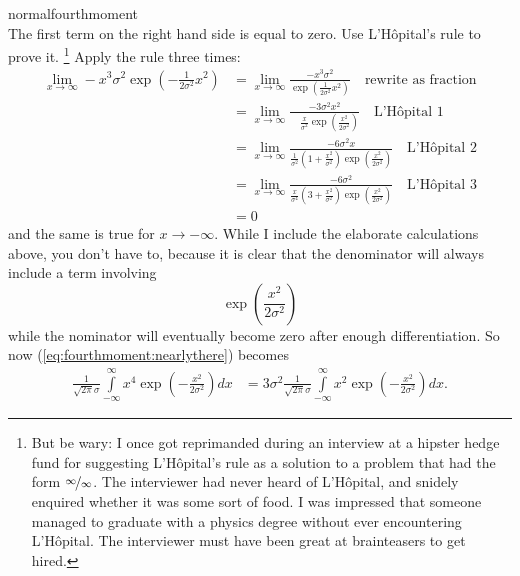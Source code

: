 \begin{answer}{normalfourthmoment}
\begin{equation}
\end{equation}
The first term on the right hand side is equal to zero.
Use L'Hôpital's rule to prove it.%
\footnote{But be wary:
I once got reprimanded during an interview at a hipster hedge fund for suggesting
L'Hôpital's rule as a solution to a problem that had the form $\nicefrac{\infty}{\infty}$.
The interviewer had never heard of L'Hôpital, and snidely enquired whether it was some sort of food.
I was impressed that someone managed to graduate with a physics degree without ever encountering L'Hôpital.
The interviewer must have been great at brainteasers to get hired.}
Apply the rule three times:
\begin{equation}
\label{eq:fourthmoment:lhopital}
\begin{aligned}
\lim_{x \rightarrow \infty}
-x^3
\sigma^2
\exp{\left( -\frac{1}{2\sigma^2} x^2 \right)}
&=
\lim_{x \rightarrow \infty}
\frac{-x^3 \sigma^2 }{ \exp{\left( \frac{1}{2\sigma^2} x^2 \right)} }
\quad\text{rewrite as fraction}
\\
&=
\lim_{x \rightarrow \infty}
\frac{
  - 3 \sigma^{2} x^{2}
  }{
  \quad \frac{x}{\sigma^{2}} \exp{\left(\frac{x^{2}}{2 \sigma^{2}}\right)}
  }
\quad\text{L'Hôpital 1}
\\
&=
\lim_{x \rightarrow \infty}
\frac{ - 6 \sigma^{2} x }{
\frac{1 }{\sigma^{2}} \left(1 + \frac{x^{2}}{\sigma^{2}}\right)
\exp{\left(\frac{x^{2}}{2 \sigma^{2}}\right)}
}
\quad\text{L'Hôpital 2}
\\
&=
\lim_{x \rightarrow \infty}
\frac{ - 6 \sigma^{2} }{
\frac{x}{\sigma^{4}} \left(3 + \frac{x^{2}}{\sigma^{2}}\right)
\exp{\left(\frac{x^{2}}{2 \sigma^{2}}\right)}
}
\quad\text{L'Hôpital 3}
\\
&= 0
\end{aligned}
\end{equation}
and the same is true for
${x \rightarrow -\infty}$.
While I include the elaborate calculations above, you don't have to, because it is clear that the denominator will always include a term involving
\[
\exp{\left(\frac{x^{2}}{2 \sigma^{2}}\right)}
\]
while the nominator will eventually become zero after enough differentiation.
So now (\ref{eq:fourthmoment:nearlythere}) becomes
\begin{align*}
\frac{1}{\sqrt{2 \pi} \sigma }
\int\limits_{-\infty}^{\infty}{
  x^4
  \exp{\left( -\frac{x^2}{2\sigma^2}  \right)}
  dx
}
&=
3 \sigma^2
\frac{1}{\sqrt{2 \pi} \sigma }
\int\limits_{-\infty}^{\infty}{
  x^2
  \exp{\left( -\frac{x^2}{2\sigma^2}  \right)}
  dx
}
\text{.}
\end{align*}

\end{answer}
